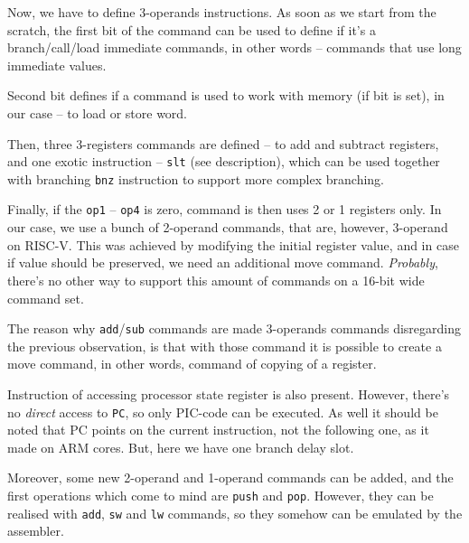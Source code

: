\documentclass[a4paper]{article}
\begin{document}
Now, we have to define 3-operands instructions. As soon as we start from the scratch, the first bit of the command can be used to define if it's a branch/call/load immediate commands, in other words -- commands that use long immediate values. 

Second bit defines if a command is used to work with memory (if bit is set), in our case -- to load or store word.

Then, three 3-registers commands are defined -- to add and subtract registers, and one exotic instruction -- \texttt{slt} (see description), which can be used together with branching \texttt{bnz} instruction to support more complex branching.

Finally, if the \texttt{op1} -- \texttt{op4} is zero, command is then uses 2 or 1 registers only. In our case, we use a bunch of 2-operand commands, that are, however, 3-operand on RISC-V.
This was achieved by modifying the initial register value, and in case if value should be preserved, we need an additional move command.
\textit{Probably}, there's no other way to support this amount of commands on a 16-bit wide command set.

The reason why \texttt{add}/\texttt{sub} commands are made 3-operands commands disregarding the previous observation, is that with those command it is possible to create a move command, in other words, command of copying of a register.

Instruction of accessing processor state register is also present. However, there's no \textit{direct} access to \texttt{PC}, so only PIC-code can be executed. As well it should be noted that PC points on the current instruction, not the following one, as it made on ARM cores.
But, here we have one branch delay slot.

Moreover, some new 2-operand and 1-operand commands can be added, and the first operations which come to mind are \texttt{push} and \texttt{pop}. However, they can be realised with \texttt{add}, \texttt{sw} and \texttt{lw} commands, so they somehow can be emulated by the assembler.
\end{document}
